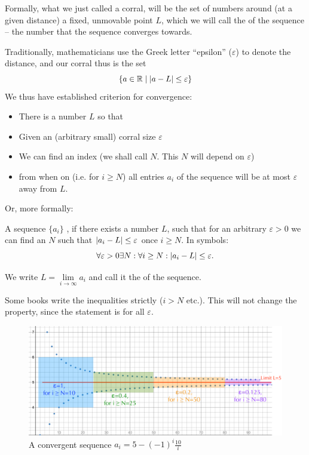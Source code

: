 Formally, what we just called a corral, will be the set of numbers around (at a given
distance) a fixed,
unmovable point $L$, which we will call the  of the sequence -- the number
that the sequence converges towards.

Traditionally, mathematicians use the Greek letter ``epsilon'' ($\varepsilon$)
to denote the distance,
and our corral thus is the set
\[
\{a\in{\mathbb R}\mid \left|a-L\right|\le\varepsilon\}
\]
We thus have established criterion for convergence:
\begin{itemize}
\item There is a number $L$ so that
\item Given an (arbitrary small) corral size $\varepsilon$
\item We can find an index (we shall call $N$. This $N$ will depend on $\varepsilon$)
\item from when on (i.e. for $i\ge N$) all entries $a_i$ of the sequence will be
at most $\varepsilon$ away from $L$.
\end{itemize}
Or, more formally:
\begin{defn}
A sequence $\{a_i\}$ , if there exists a number $L$,
such that for an arbitrary $\varepsilon>0$ we can find
an $N$ such that $\left|a_i-L\right|\le\varepsilon$ once $i\ge N$. In symbols:
\[
\forall\varepsilon>0\exists N:\forall i\ge N: \left|a_i-L\right|\le\varepsilon.
\]

We write $L=\lim\limits_{i\to\infty} a_i$ and call it the
 of the sequence.
\end{defn}
\begin{note}
Some books write the inequalities strictly ($i>N$ etc.). This will not
change the property, since the statement is for all $\varepsilon$.
\end{note}

\begin{figure}[t]
\begin{center}
\includegraphics[width=12cm]{pic/LimitCorral.pdf}
\end{center}
\caption{A convergent sequence $a_i=5-(-1)^i\frac{10}{i}$}
\label{figlimitcorral}
\end{figure}

